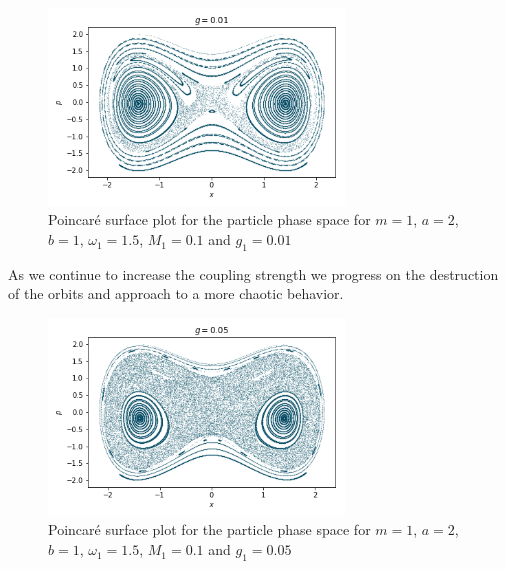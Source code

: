 \begin{figure}[H]
\centering
\includegraphics[width=0.7\textwidth]{Figures/poincare_g001.png}
\caption{Poincaré surface plot for the particle phase space for $m=1$, $a=2$, $b=1$, $\omega_1=1.5$, $M_1=0.1$ and $g_1=0.01$
}
\label{fig:poinc_g001}
\end{figure}
As we continue to increase the coupling strength we progress on the destruction of the orbits and approach to a more chaotic behavior.

\begin{figure}[H]
\centering
\includegraphics[width=0.7\textwidth]{Figures/poincare_g005.png}
\caption{Poincaré surface plot for the particle phase space for $m=1$, $a=2$, $b=1$, $\omega_1=1.5$, $M_1=0.1$ and $g_1=0.05$
}
\label{fig:poinc_g005}
\end{figure}

